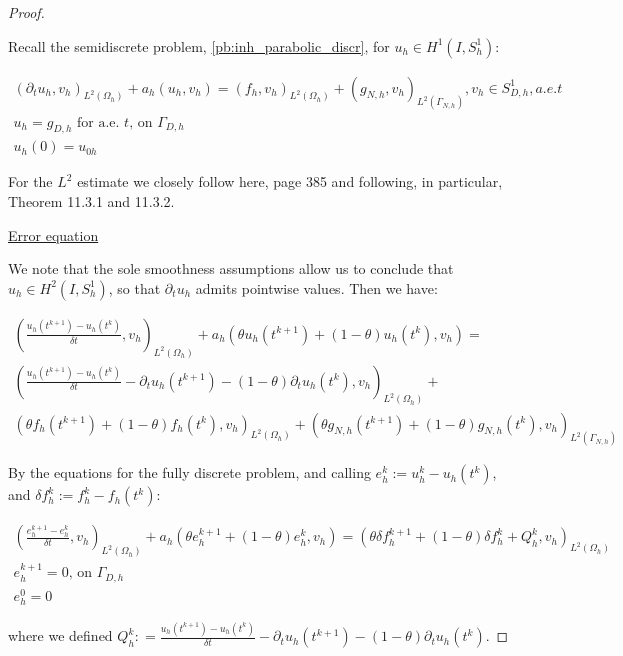 \documentclass[english,a4paper,10pt,oneside]{scrbook}	%
\theoremstyle{break}
\newenvironment{mproof}[1][\proofname]{%
  \begin{proof}[#1]$ $\par\nobreak\ignorespaces
}{%
  \end{proof}
}
\renewcommand*{\proofname}{Proof}
\theoremstyle{remark}
\newcommand{\ds}{\displaystyle}
\begin{document}
\begin{mproof}

Recall the semidiscrete problem, \cref{pb:inh_parabolic_discr}, for  $u_h \in H^1(I, S^1_h)$:
 
\begin{align*}
(\partial_t u_h, v_h)_{L^2(\Omega_h)} + a_h(u_h, v_h) = (f_h, v_h)_{L^2(\Omega_h)} + (g_{N,h}, v_h)_{L^2(\Gamma_{N,h})}, v_h \in S^1_{D,h}, a.e. t\\
u_h=g_{D,h}\text{ for a.e. }t \text{,  on } \Gamma_{D,h}\\
u_h(0)=u_{0h}
\end{align*}

For the $L^2$ estimate we closely follow \cite{quarteroni} here, page 385 and following, in particular, Theorem 11.3.1 and 11.3.2.

\underline{Error equation}

We note that the sole smoothness assumptions allow us to conclude that $u_h \in H^2(I, S^1_h)$, so that $\partial_t u_h$ admits pointwise values. Then we have:

\begin{align*}
\left ( \frac{u_{h}(t^{k+1})-u_h(t^k)}{\delta t}, v_h\right)_{L^2(\Omega_h)} + a_h(\theta u_h(t^{k+1}) + (1-\theta) u_h(t^{k}), v_h) =\\ \left ( \frac{u_{h}(t^{k+1})-u_h(t^k)}{\delta t} - \partial_t u_h(t^{k+1}) - (1-\theta)\partial_t u_h(t^k), v_h\right)_{L^2(\Omega_h)} +\\ (\theta f_h(t^{k+1})+(1-\theta)f_h(t^{k}), v_h)_{L^2(\Omega_h)} + (\theta g_{N,h}(t^{k+1})+(1-\theta)g_{N,h}(t^{k}), v_h)_{L^2(\Gamma_{N,h})}
\end{align*}

By the equations for the fully discrete problem, and calling $e_h^k:=u_h^k-u_h(t^k)$, and $\delta f_h^k:=f_h^k-f_h(t^k)$:

\begin{align}
\label{eqn:discr_err}
\left ( \frac{e_{h}^{k+1}-e_h^k}{\delta t}, v_h\right)_{L^2(\Omega_h)} + a_h(\theta e_h^{k+1}+(1-\theta)e^k_h, v_h) = (\theta \delta f_h^{k+1}+(1-\theta)\delta f_h^k + Q_h^k, v_h)_{L^2(\Omega_h)} \\
e_h^{k+1}=0  \text{,  on } \Gamma_{D,h}\\
e_h^0=0
\end{align}

where we defined $Q_h^k:\ds =\frac{u_{h}(t^{k+1})-u_h(t^k)}{\delta t} - \partial_t u_h(t^{k+1}) - (1-\theta)\partial_tu_h(t^k)$.


\end{mproof}
\end{document}
